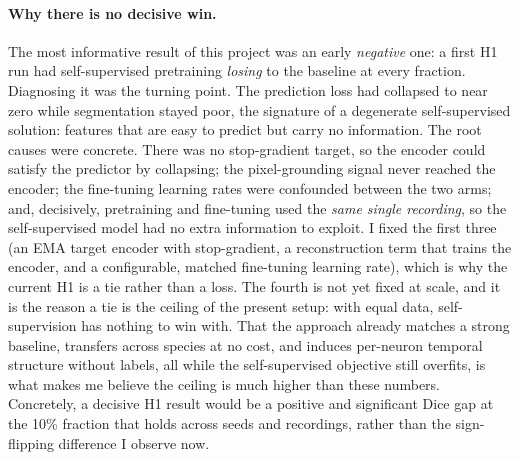 \documentclass[twoside,11pt]{article}
\begin{document}
\paragraph{Why there is no decisive win.} The most informative result
of this project was an early \emph{negative} one: a first H1 run had self-supervised pretraining
\emph{losing} to the baseline at every fraction. Diagnosing it was the turning point. The prediction
loss had collapsed to near zero while segmentation stayed poor, the signature of a degenerate
self-supervised solution: features that are easy to predict but carry no information. The root causes
were concrete. There was no stop-gradient target, so the encoder could satisfy the predictor by
collapsing; the pixel-grounding signal never reached the encoder; the fine-tuning learning rates were
confounded between the two arms; and, decisively, pretraining and fine-tuning used the \emph{same
single recording}, so the self-supervised model had no extra information to exploit. I fixed the
first three (an EMA target encoder with stop-gradient, a reconstruction term that trains the encoder,
and a configurable, matched fine-tuning learning rate), which is why the current H1 is a tie rather
than a loss. The fourth is not yet fixed at scale, and it is the reason a tie is the ceiling of the
present setup: with equal data, self-supervision has nothing to win with. That the approach already
matches a strong baseline, transfers across species at no cost, and induces per-neuron temporal
structure without labels, all while the self-supervised objective still overfits, is what
makes me believe the ceiling is much higher than these numbers. Concretely, a decisive H1 result
would be a positive and significant Dice gap at the 10\% fraction that holds across seeds and
recordings, rather than the sign-flipping difference I observe now.
\end{document}
